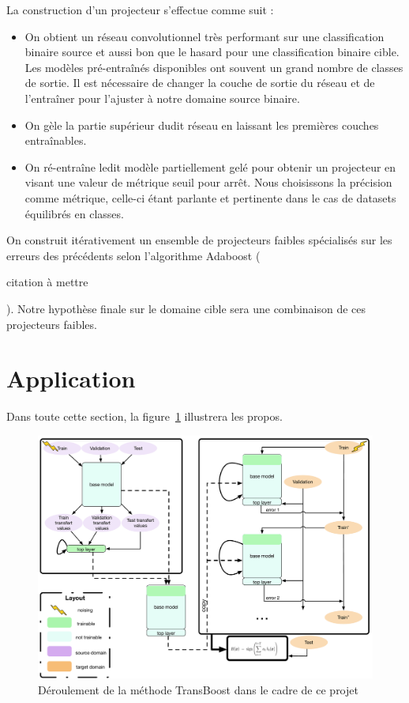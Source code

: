 \documentclass[11 pt]{article}
\begin{document}
\pagebreak

\begin{samepage}
La construction d'un projecteur s'effectue comme suit : \medskip
  \begin{itemize}
    \item On obtient un réseau convolutionnel très performant sur une classification binaire source et aussi bon que le hasard pour une classification binaire cible. Les modèles pré-entraînés disponibles ont souvent un grand nombre de classes de sortie. Il est nécessaire de changer la couche de sortie du réseau et de l’entraîner pour l’ajuster à notre domaine source binaire.
    \nopagebreak
    \item On gèle la partie supérieur dudit réseau en laissant les premières couches entraînables.
    \nopagebreak
    \item On ré-entraîne ledit modèle partiellement gelé pour obtenir un projecteur en visant une valeur de métrique seuil pour arrêt. Nous choisissons la précision comme métrique, celle-ci étant parlante et pertinente dans le cas de datasets équilibrés en classes.
  \end{itemize}
\end{samepage}

On construit itérativement un ensemble de projecteurs faibles spécialisés sur les erreurs des précédents selon l'algorithme Adaboost (\begin{huge} citation à mettre \end{huge}). Notre hypothèse finale sur le domaine cible sera une combinaison de ces projecteurs faibles.

\section{Application}

Dans toute cette section, la figure~\ref{figRes} illustrera les propos.

\begin{figure}[H]
  \includegraphics[width=\textwidth]{fig1.pdf}
  \caption{Déroulement de la méthode TransBoost dans le cadre de ce projet}
  \label{figRes}
\end{figure}
\end{document}
